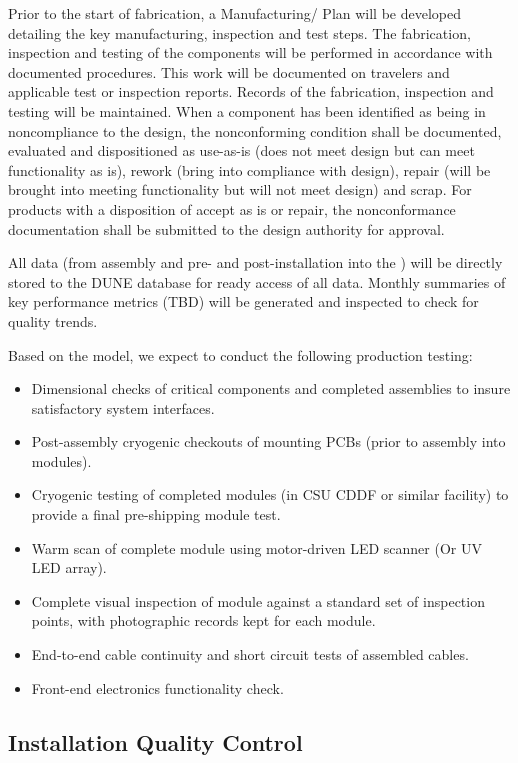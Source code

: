 Prior to the start of fabrication, a Manufacturing/ Plan will be developed detailing the key manufacturing, inspection and test steps.  The fabrication, inspection and testing of the components will be performed in accordance with documented procedures. This work will be documented on travelers and applicable test or inspection reports. Records of the fabrication, inspection and testing will be maintained. When a component has been identified as being in noncompliance to the design, the nonconforming condition shall be documented, evaluated and dispositioned as use-as-is (does not meet design but can meet functionality as is), rework (bring into compliance with design), repair (will be brought into meeting functionality but will not meet design) and scrap. For products with a disposition of accept as is or repair, the nonconformance documentation shall be submitted to the design authority for approval.   

All  data  (from assembly and pre- and post-installation into the ) will be directly stored to the DUNE database for ready access of all  data.  Monthly summaries of key performance metrics (TBD) will be generated and inspected to check for quality trends.

Based on the  model, we expect to conduct the following production testing:
\begin{itemize}
\item Dimensional checks of critical components and completed assemblies to insure satisfactory system interfaces.
\item Post-assembly cryogenic checkouts of  mounting PCBs (prior to assembly into  modules).
\item Cryogenic testing of completed modules (in CSU CDDF or similar facility) to provide a final pre-shipping module test.
\item Warm scan of complete module using motor-driven LED scanner (Or UV LED array).
\item Complete visual inspection of module against a standard set of inspection points, with photographic records kept for each module.
\item End-to-end cable continuity and short circuit tests of assembled cables.
\item Front-end electronics functionality check.
\end{itemize}

\subsection{Installation Quality Control}
\label{sec:fdsp-pd-prodqc}

